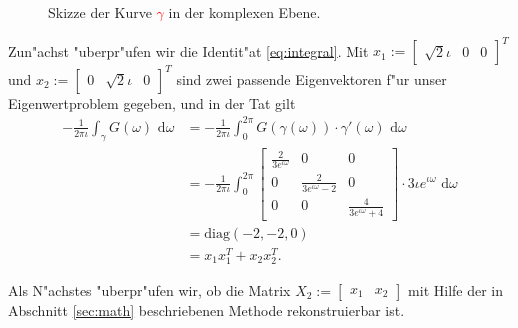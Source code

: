 \begin{figure}[h!]
	\center
	\caption{Skizze der Kurve \textcolor{red}{$\gamma$} in der komplexen Ebene.}
\end{figure}

Zun"achst "uberpr"ufen wir
die Identit"at \eqref{eq:integral}. Mit $x_1 := \begin{bmatrix} \sqrt2 \iota & 0 & 0
\end{bmatrix}^T$
und $x_2 := \begin{bmatrix} 0 & \sqrt2 \iota &0\end{bmatrix}^T$ sind zwei passende
Eigenvektoren f"ur unser Eigenwertproblem gegeben, und in der Tat gilt
\begin{align*}
-\frac{1}{2\pi\iota} \int_\gamma G(\omega) \text{ d}\omega &=
-\frac{1}{2\pi\iota}\int_0^{2\pi} G(\gamma(\omega))\cdot \gamma'(\omega)
\text{ d}\omega \\
&= -\frac{1}{2\pi\iota}\int_0^{2\pi} \begin{bmatrix} \frac{2}{3e^{\iota\omega}}&0&0\\
0 & \frac{2}{3e^{\iota\omega}-2}&0\\
0&0&\frac{4}{3e^{\iota\omega}+4}
 \end{bmatrix}\cdot 3\iota e^{\iota\omega}
\text{ d}\omega \\
&= \text{diag}(-2,-2,0) \\
&= x_1 x_1^{T} + x_2 x_2^T.
\end{align*}

Als N"achstes "uberpr"ufen wir, ob die Matrix $X_2 := \begin{bmatrix} x_1 & x_2\end{bmatrix}$ mit Hilfe der in Abschnitt \ref{sec:math} beschriebenen Methode rekonstruierbar ist.\\

